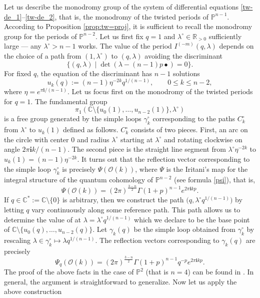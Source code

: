 \documentclass[10pt,a4paper]{article}
\numberwithin{equation}{section}
\newcommand{\CC}{\mathbb{C}}
\newcommand{\PP}{\mathbb{P}}
\newcommand{\RR}{\mathbb{R}}
\newcommand{\ii}{\mathbf{i}}
\renewcommand{\O}{\mathcal{O}}
\begin{document}
Let us describe the monodromy group of the system of differential
equations \eqref{tw-de_1}--\eqref{tw-de_2}, that is, the monodromy of
the twisted periods of $\PP^{n-1}$. According to Proposition
\ref{prop:tw=proj}, it is sufficient to recall the monodromy group for
the periods of $\PP^{n-2}$. Let us first fix $q=1$ and
$\lambda^\circ\in \RR_{>0}$ sufficiently large --- any
$\lambda^\circ>n-1$ works. The value of the period
$I^{(-m)}(q,\lambda)$ depends on the choice of a path from
$(1,\lambda^\circ)$ to $(q,\lambda)$ avoiding the discriminant
\[
\{(q,\lambda)\mid  \operatorname{det}(\lambda-(n-1)p\bullet) = 0\}.
\]
For fixed $q$, the equation of the discriminant has $n-1$ solutions
\[
u_k(q):=(n-1)\eta^{-2k} q^{1/(n-1)}, \qquad 0\leq k\leq n-2,
\]
where $\eta=e^{\pi \ii/(n-1)}$. Let us focus first on the monodromy of
the twisted periods for $q=1$. The fundamental group
\[
\pi_1(\CC\setminus{\{u_0(1),\dots,u_{n-2}(1)\}},\lambda^\circ)
\]
is a free group generated by the simple loops $\gamma_k^\circ$
corresponding to the paths $C_k^\circ$ from $\lambda^\circ$ to
$u_k(1)$ defined as follows. $C_k^\circ$ consists of two pieces. First,
an arc on the
circle with center $0$ and radius $\lambda^\circ$ starting at
$\lambda^\circ$ and rotating clockwise on angle $2\pi\ii k/(n-1)$. The
second piece is the straight line segment from $\lambda^\circ
\eta^{-2k}$ to $u_k(1)= (n-1) \eta^{-2k}$. It turns out that the
reflection vector corresponding to the simple loop $\gamma_k^\circ$ is
precisely $\Psi(\O(k))$, where $\Psi$ is the Iritani's map for the
integral structure of the quantum cohomology of $\PP^{n-2}$ (see
formula \eqref{psi}), that is,
\[
\Psi(\O(k)) = (2\pi)^{\frac{3-n}{2}} \Gamma(1+p)^{n-1} e^{2\pi\ii k p}.
\]
If $q\in \CC^*:=\CC\setminus{\{0\}}$ is arbitrary, then we construct
the path $\big(q,\lambda^\circ q^{1/(n-1)}\big)$ by letting $q$ vary
continuously along some reference path. This path allows us to
determine the value of  at
$\lambda=\lambda^\circ q^{1/(n-1)}$ which we declare to be the base
point of $\CC\setminus{\{u_0(q),\dots,u_{n-2}(q)\}}$. Let
$\gamma_k(q)$ be the simple loop obtained from $\gamma_k^\circ$ by
rescaling $\lambda\in \gamma_k^\circ\mapsto \lambda q^{1/(n-1)}$. The
reflection vectors corresponding to $\gamma_k(q)$ are precisely
\[
\Psi_q(\O(k)) =
(2\pi)^{\frac{3-n}{2}} \Gamma(1+p)^{n-1} q^{-p} e^{2\pi \ii k p}.
\]
The proof of the above facts in the case of $\PP^2$ (that is $n=4$)
can be found in \cite{Milanov:p2}. In general, the argument is
straightforward to generalize. Now let us apply the above construction
\end{document}
